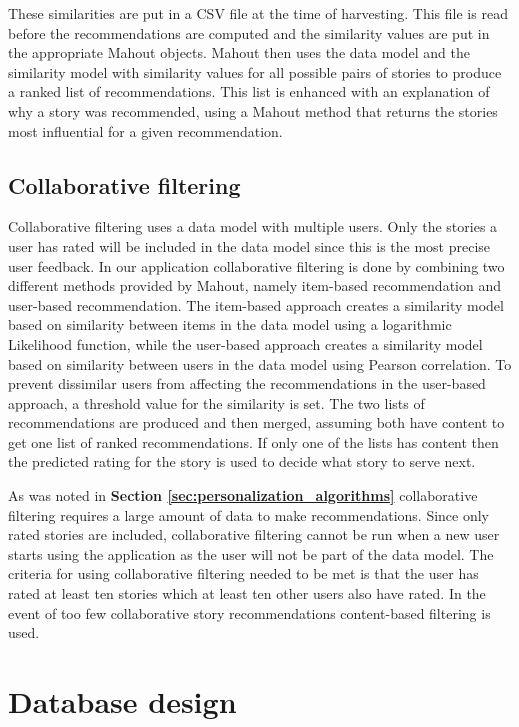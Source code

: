 These similarities are put in a CSV file at the time of harvesting. This file is read before the recommendations are computed and the similarity values are put in the appropriate Mahout objects. Mahout then uses the data model and the similarity model with similarity values for all possible pairs of stories to produce a ranked list of recommendations. This list is enhanced with an explanation of why a story was recommended, using a Mahout method that returns the stories most influential for a given recommendation.


\subsection{Collaborative filtering}

Collaborative filtering uses a data model with multiple users. Only the stories a user has rated will be included in the data model since this is the most precise user feedback. In our application collaborative filtering is done by combining two different methods provided by Mahout, namely item-based recommendation and user-based recommendation. The item-based approach creates a similarity model based on similarity between items in the data model using a logarithmic Likelihood function, while the user-based approach creates a similarity model based on similarity between users in the data model using Pearson correlation. To prevent dissimilar users from affecting the recommendations in the user-based approach, a threshold value for the similarity is set. The two lists of recommendations are produced and then merged, assuming both have content to get one list of ranked recommendations. If only one of the lists has content then the predicted rating for the story is used to decide what story to serve next.\newline

As was noted in \textbf{Section \ref{sec:personalization_algorithms}} collaborative filtering requires a large amount of data to make recommendations. Since only rated stories are included, collaborative filtering cannot be run when a new user starts using the application as the user will not be part of the data model. The criteria for using collaborative filtering needed to be met is that the user has rated at least ten stories which at least ten other users also have rated. In the event of too few collaborative story recommendations content-based filtering is used. 

\section{Database design}
\label{sec:database_design}

